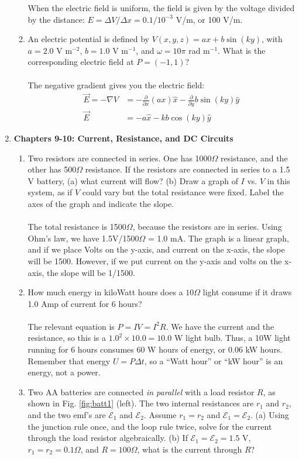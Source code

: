 \documentclass[10pt]{article}
\begin{document}
\begin{enumerate}
\begin{enumerate}
When the electric field is uniform, the field is given by the voltage divided by the distance: $E = \Delta V / \Delta x = 0.1/10^{-3}$ V/m, or 100 V/m. \\
\item An electric potential is defined by $V(x,y,z) = a x + b \sin(ky)$, with $a = 2.0$ V m$^{-2}$, $b = 1.0$ V m$^{-1}$, and $\omega = 10\pi$ rad m$^{-1}$.  What is the corresponding electric field at $P = (-1,1)$? \\ \\
The negative gradient gives you the electric field:
\begin{align}
\vec{E} = -\nabla V &= -\frac{\partial}{\partial x} (ax)\hat{x} - \frac{\partial}{\partial y} b\sin(ky)\hat{y} \\
\vec{E} &= -a\hat{x}-kb \cos(ky)\hat{y}
\end{align}
\end{enumerate}
\item \textbf{Chapters 9-10: Current, Resistance, and DC Circuits}
\begin{enumerate}
\item Two resistors are connected in series.  One has 1000$\Omega$ resistance, and the other has 500$\Omega$ resistance.  If the resistors are connected in series to a 1.5 V battery, (a) what current will flow? (b) Draw a graph of $I$ vs. $V$ in this system, as if $V$ could vary but the total resistance were fixed.  Label the axes of the graph and indicate the slope. \\ \\
The total resistance is 1500$\Omega$, because the resistors are in series.  Using Ohm's law, we have 1.5V/1500$\Omega$ = 1.0 mA.  The graph is a linear graph, and if we place Volts on the y-axis, and current on the x-axis, the slope will be 1500.  However, if we put current on the y-axis and volts on the x-axis, the slope will be 1/1500. \\
\item How much energy in kiloWatt hours does a $10\Omega$ light consume if it draws 1.0 Amp of current for 6 hours? \\ \\
The relevant equation is $P=IV = I^2 R$.  We have the current and the resistance, so this is a $1.0^2 \times 10.0 = 10.0$ W light bulb.  Thus, a 10W light running for 6 hours consumes 60 W hours of energy, or 0.06 kW hours.  Remember that energy $U = P \Delta t$, so a ``Watt hour'' or ``kW hour'' is an energy, not a power. \\
\item Two AA batteries are connected \textit{in parallel} with a load resistor $R$, as shown in Fig. \ref{fig:batt1} (left).  The two internal resistances are $r_1$ and $r_2$, and the two emf's are $\mathcal{E}_1$ and $\mathcal{E}_2$. Assume $r_1 = r_2$ and $\mathcal{E}_1 = \mathcal{E}_2$.  (a) Using the junction rule once, and the loop rule twice, solve for the current through the load resistor algebraically. (b) If  $\mathcal{E}_1 = \mathcal{E}_2 = 1.5$ V, $r_1 = r_2 = 0.1 \Omega$, and $R = 100\Omega$, what is the current through $R$? \\ \vspace{4cm}

\end{enumerate}
\end{enumerate}
\end{document}
